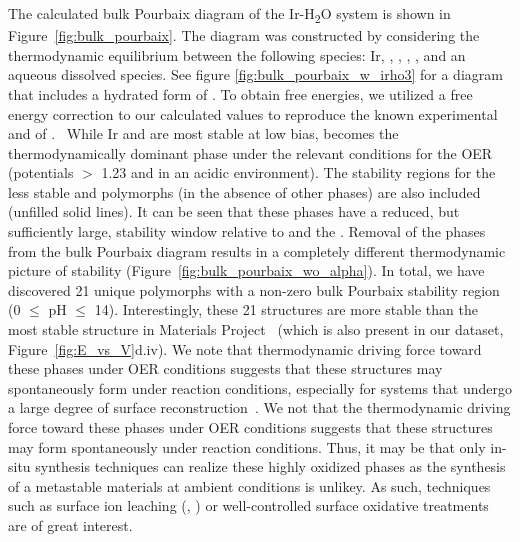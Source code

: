 %
%
The calculated bulk Pourbaix diagram of the Ir-H\textsubscript{2}O system is shown in Figure~\ref{fig:bulk_pourbaix}.
%
The diagram was constructed by considering the thermodynamic equilibrium between the following species: Ir, \rIrOtwo, \aIrOthree, \rIrOthree, \bIrOthree, and an aqueous dissolved \IrOfourm species.
%
See figure \ref{fig:bulk_pourbaix_w_irho3} for a diagram that includes a hydrated form of \aIrOthree.
%
To obtain free energies, we utilized a free energy correction to our calculated values to reproduce the known experimental \DHf and \DGf of \rIrOtwo.~\cite{Barin1995}
%
While Ir and \rIrOtwo are most stable at low bias, \aIrOthree becomes the thermodynamically dominant phase under the relevant conditions for the OER (potentials $>$ \num{1.23} \VRHE and in an acidic environment).
%
The stability regions for the less stable \bIrOthree and \rIrOthree polymorphs (in the absence of other \IrOthree phases) are also included (unfilled solid lines).
%
It can be seen that these phases have a reduced, but sufficiently large, stability window relative to \IrOtwo and the \IrOfourm.
%
Removal of the \IrOthree phases from the bulk Pourbaix diagram results in a completely different thermodynamic picture of \IrOtwo stability (Figure~\ref{fig:bulk_pourbaix_wo_alpha}).
In total, we have discovered 21 unique \IrOthree polymorphs with a non-zero bulk Pourbaix stability region
(0 $\leq$ pH $\leq$ 14).
%
Interestingly, these 21 structures are more stable than the most stable \IrOthree structure in Materials Project~\cite{mp-1097041} (which is also present in our dataset, Figure~\ref{fig:E_vs_V}d.iv).
%
We note that thermodynamic driving force toward these \IrOthree phases under OER conditions suggests that these structures may spontaneously form under reaction conditions,
especially for systems that undergo a large degree of surface reconstruction~\cite{Seitz2016}.
%
We not that the thermodynamic driving force toward these \IrOthree phases under OER conditions suggests that these structures may form spontaneously under reaction conditions.
%
Thus, it may be that only in-situ synthesis techniques can realize these highly oxidized phases as the synthesis of a metastable materials at ambient conditions is unlikey.
%
As such, techniques such as surface ion leaching (\cite{Pearce2017}, \cite{Seitz2016}) or well-controlled surface oxidative treatments are of great interest.


